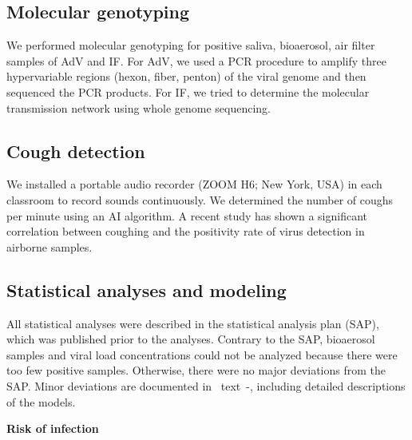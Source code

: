 \documentclass[fleqn,11pt]{wlscirep}
\begin{document}
\subsection{Molecular genotyping}

We performed molecular genotyping for positive saliva, bioaerosol, air filter samples of AdV and IF. For AdV, we used a PCR procedure to amplify three hypervariable regions (hexon, fiber, penton) of the viral genome and then sequenced the PCR products\cite{Akello2021SciRep}. For IF, we tried to determine the molecular transmission network using whole genome sequencing\cite{Kelly2022FrontiersImmuno}.

\subsection{Cough detection}

We installed a portable audio recorder (ZOOM H6; New York, USA) in each classroom to record sounds continuously. We determined the number of coughs per minute using an AI algorithm\cite{Bertschinger2023IEEE}. A recent study has shown a significant correlation between coughing and the positivity rate of virus detection in airborne samples\cite{Hanna2023PONE}.

\subsection{Statistical analyses and modeling}

All statistical analyses were described in the statistical analysis plan (SAP)\cite{Banholzer2023SAP}, which was published prior to the analyses. Contrary to the SAP, bioaerosol samples and viral load concentrations could not be analyzed because there were too few positive samples. Otherwise, there were no major deviations from the SAP. Minor deviations are documented in \supp~text~-, including detailed descriptions of the models. \medskip

\noindent\textbf{Risk of infection} \smallskip
\end{document}
